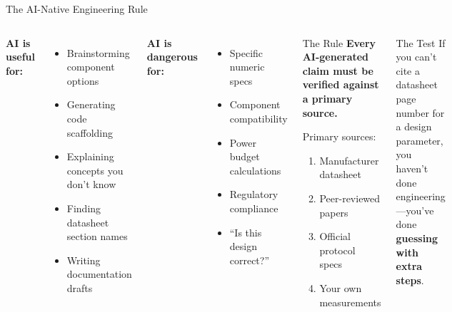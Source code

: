\documentclass[aspectratio=169,11pt]{beamer}
\begin{document}
\begin{frame}{The AI-Native Engineering Rule}
    \begin{columns}
        \textbf{AI is useful for:}
        \begin{itemize}
            \item Brainstorming component options
            \item Generating code scaffolding
            \item Explaining concepts you don't know
            \item Finding datasheet section names
            \item Writing documentation drafts
        \end{itemize}
        
        \vspace{0.3cm}
        \textbf{AI is dangerous for:}
        \begin{itemize}
            \item Specific numeric specs
            \item Component compatibility
            \item Power budget calculations
            \item Regulatory compliance
            \item ``Is this design correct?''
        \end{itemize}
        
        \begin{alertblock}{The Rule}
            \textbf{Every AI-generated claim must be verified against a primary source.}
            
            \vspace{0.2cm}
            Primary sources:
            \begin{enumerate}
                \item Manufacturer datasheet
                \item Peer-reviewed papers
                \item Official protocol specs
                \item Your own measurements
            \end{enumerate}
        \end{alertblock}
        
        \vspace{0.2cm}
        \begin{exampleblock}{The Test}
            If you can't cite a datasheet page number for a design parameter, you haven't done engineering---you've done \textbf{guessing with extra steps}.
        \end{exampleblock}
    \end{columns}
\end{frame}
\end{document}
